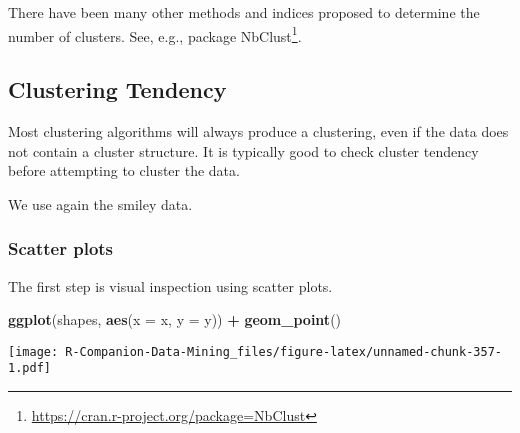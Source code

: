 \documentclass[
  notitlepage]{book}
\newenvironment{Shaded}{\begin{snugshade}}{\end{snugshade}}
\newcommand{\DataTypeTok}[1]{\textcolor[rgb]{0.13,0.29,0.53}{#1}}
\newcommand{\DecValTok}[1]{\textcolor[rgb]{0.00,0.00,0.81}{#1}}
\newcommand{\FloatTok}[1]{\textcolor[rgb]{0.00,0.00,0.81}{#1}}
\newcommand{\KeywordTok}[1]{\textcolor[rgb]{0.13,0.29,0.53}{\textbf{#1}}}
\newcommand{\NormalTok}[1]{#1}
\newcommand{\OperatorTok}[1]{\textcolor[rgb]{0.81,0.36,0.00}{\textbf{#1}}}
\newcommand{\StringTok}[1]{\textcolor[rgb]{0.31,0.60,0.02}{#1}}
\DeclareRobustCommand{\href}[2]{#2\footnote{\url{#1}}}
\begin{document}
There have been many other methods and indices proposed to determine the
number of clusters. See, e.g., package
\href{https://cran.r-project.org/package=NbClust}{NbClust}.

\hypertarget{clustering-tendency}{%
\subsection{Clustering Tendency}\label{clustering-tendency}}

Most clustering algorithms will always produce a clustering, even if the
data does not contain a cluster structure. It is typically good to check
cluster tendency before attempting to cluster the data.

We use again the smiley data.

\begin{Shaded}
\end{Shaded}

\hypertarget{scatter-plots}{%
\subsubsection{Scatter plots}\label{scatter-plots}}

The first step is visual inspection using scatter plots.

\begin{Shaded}
\begin{Highlighting}[]
\KeywordTok{ggplot}\NormalTok{(shapes, }\KeywordTok{aes}\NormalTok{(}\DataTypeTok{x =}\NormalTok{ x, }\DataTypeTok{y =}\NormalTok{ y)) }\OperatorTok{+}\StringTok{ }\KeywordTok{geom\_point}\NormalTok{()}
\end{Highlighting}
\end{Shaded}

\texttt{[image: R-Companion-Data-Mining\_files/figure-latex/unnamed-chunk-357-1.pdf]}
\end{document}
